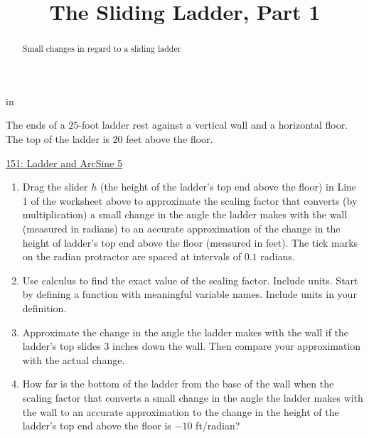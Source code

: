 \documentclass{ximera}
\title{The Sliding Ladder, Part 1}
\newcommand{\pskip}{\vskip 0.1 in}
\begin{document}
\begin{abstract}
Small changes in regard to a sliding ladder
\end{abstract}
\maketitle


\pskip



\begin{question}  \label{QKdefer33}
The ends of a $25$-foot ladder rest against a vertical wall and a horizontal floor. The top of the ladder is $20$ feet above the floor.

\begin{onlineOnly}
    \begin{center}
\end{center}
\end{onlineOnly}

\href{https://www.desmos.com/calculator/syz7zherzf}{151: Ladder and ArcSine 5}

\begin{enumerate}
\item Drag the slider $h$ (the height of the ladder's top end above the floor) in Line 1 of the worksheet above to approximate the scaling factor that converts (by multiplication) a small change in the angle the ladder makes with the wall (measured in radians)  to an accurate approximation of the change in the height of ladder's top end above the floor (measured in feet). The tick marks on the radian protractor are spaced at intervals of $0.1$ radians.

\item Use calculus to find the exact value of the scaling factor. Include units. Start by defining a function with meaningful variable names. Include units in your definition.

\item Approximate the change in the angle the ladder makes with the wall if the ladder's top slides $3$ inches down the wall. Then compare your approximation with the actual change.

\item How far is the bottom of the ladder from the base of the wall when the scaling factor that converts a small change in the angle the ladder makes with the wall to an accurate approximation to the change in the height of the ladder's top end above the floor is $-10$ ft/radian?


\end{enumerate}
\end{question}
\end{document}
